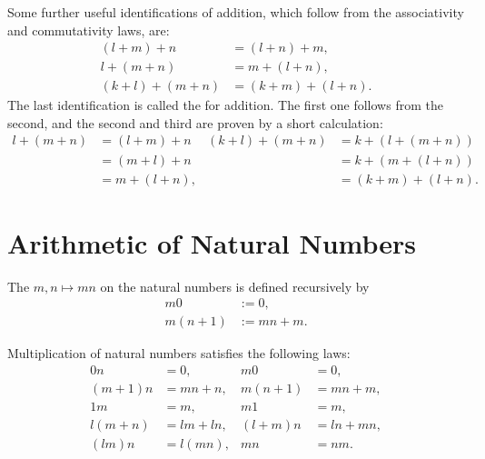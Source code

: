 Some further useful identifications of addition, which follow from the associativity and commutativity laws, are:
\begin{align*}
  (l+m)+n & = (l+n)+m, \\
  l+(m+n) & = m+(l+n), \\
  (k+l)+(m+n) & = (k+m)+(l+n).
\end{align*}
The last identification is called the  for addition. The first one follows from the second, and the second and third are proven by a short calculation:
\begin{align*}
  l+(m+n) & = (l+m)+n & (k+l)+(m+n) & = k+(l+(m+n)) \\
          & = (m+l)+n & & = k + (m + (l+n)) \\
          & = m+(l+n), & & = (k+m)+(l+n).
\end{align*}

\section{Arithmetic of Natural Numbers}

\begin{definition}
  The  $m,n\mapsto mn$ on the natural numbers is defined recursively by
  \begin{align*}
    m0 & := 0, \\
    m(n+1) & := mn + m.
  \end{align*}
\end{definition}

\begin{proposition}
  Multiplication of natural numbers satisfies the following laws:
  \begin{align*}
    0n & = 0, & m0 & = 0, \\
    (m+1)n & = mn+n, & m(n+1) & = mn+m, \\
    1m & = m, & m1 & = m, \\
    l(m+n) & = lm+ln, & (l+m)n & = ln+mn, \\
    (lm)n & = l(mn), & mn & = nm.
  \end{align*}
\end{proposition}

